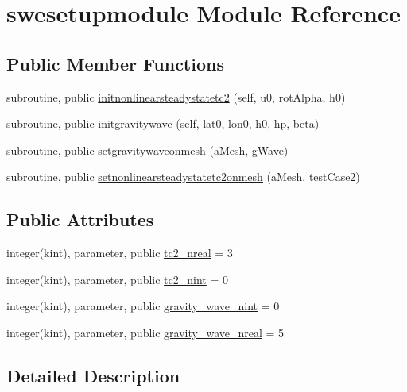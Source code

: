 \hypertarget{classswesetupmodule}{\section{swesetupmodule Module Reference}
\label{classswesetupmodule}
}
\subsection*{Public Member Functions}
\begin{DoxyCompactItemize}
\item 
subroutine, public \hyperlink{classswesetupmodule_ad6ac5b9f66baf5eef1401c016704fa49}{initnonlinearsteadystatetc2} (self, u0, rot\+Alpha, h0)
\item 
subroutine, public \hyperlink{classswesetupmodule_a336032dfcbb4ca4286a01854a986931d}{initgravitywave} (self, lat0, lon0, h0, hp, beta)
\item 
subroutine, public \hyperlink{classswesetupmodule_a1827a82b91617b4b642977c569169b03}{setgravitywaveonmesh} (a\+Mesh, g\+Wave)
\item 
subroutine, public \hyperlink{classswesetupmodule_a07e98d39c69af3599b09b94dd897f941}{setnonlinearsteadystatetc2onmesh} (a\+Mesh, test\+Case2)
\end{DoxyCompactItemize}
\subsection*{Public Attributes}
\begin{DoxyCompactItemize}
\item 
integer(kint), parameter, public \hyperlink{classswesetupmodule_a5b2f9b5922de2fbbce1239096823856a}{tc2\+\_\+nreal} = 3
\item 
integer(kint), parameter, public \hyperlink{classswesetupmodule_ace8d8c9faf9e8da9f13f36b1d2a7a2b8}{tc2\+\_\+nint} = 0
\item 
integer(kint), parameter, public \hyperlink{classswesetupmodule_aab8508cab1eeccc906eefb8066f9fc2e}{gravity\+\_\+wave\+\_\+nint} = 0
\item 
integer(kint), parameter, public \hyperlink{classswesetupmodule_a3d425d5e6084c2bae3b2a89922cfd135}{gravity\+\_\+wave\+\_\+nreal} = 5
\end{DoxyCompactItemize}


\subsection{Detailed Description}


